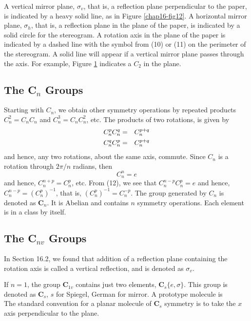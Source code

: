 A vertical mirror plane, $\sigma_v$, that is, a reflection plane
perpendicular to the paper, is indicated by a heavy solid line, as in
Figure \ref{chap16-fig12}.  A horizontal mirror plane, $\sigma_h$,
that is, a reflection plane in the plane of the paper, is indicated by
a solid circle for the stereogram.  A rotation axis in the plane of
the paper is indicated by a dashed line with the symbol from (10) or
(11) on the perimeter of the stereogram.  A solid line will appear if
a vertical mirror plane passes through the axis.  For example, Figure
\ref{chap16-fig13} indicates a $C_2$ in the plane.

\begin{figure}
\caption{}
\label{chap16-fig13}
\end{figure}

\subsection{The C$_n$ Groups}

Starting with $C_n$, we obtain other symmetry operations by repeated 
products $C^2_n = C_nC_n$ and $C^3_n = C_nC_n^2$, etc.  The products 
of two rotations, is given by
\begin{eqnarray}
C^p_n C^q_n &=& C^{p+q}_n\cr
C^q_n C^p_n &=& C_n^{p+q}
\label{chap16-eqno12a}
\end{eqnarray}
and hence, any two rotations, about the same axis, commute.  Since 
$C_n$ is a rotation through $2 \pi /n$ radians, then
\begin{equation}
C^n_n = e
\label{chap16-eqno12b}
\end{equation}
and hence, $C^{n+p}_n = C^p_n$, etc.  From (12), we see that 
$C^{n-p}_nC^p_n = e$ and hence, $C^{n-p}_n = (C^p_n)^{-1}$, that 
is, $(C^p_n)^{-1}=C^{-p}_n$.  The group generated by $C_n$ is denoted 
as {\bf C}$_n$.  It is Abelian and contains $n$ symmetry operations.  Each 
element is in a class by itself.

\subsection{The C$_{nv}$ Groups}

In Section 16.2, we found that addition of a reflection plane 
containing the rotation axis is called a vertical reflection, and is 
denoted as $\sigma_v$.

If $n = 1$, the group {\bf C}$_{1v}$ contains just two elements, {\bf 
C}$_s\{e,\sigma\}$.  This group is denoted as {\bf C}$_s$, $s$ for 
Spiegel, German for mirror.  A prototype molecule is
\begin{equation}
\end{equation}
The standard convention for a planar molecule of {\bf C}$_s$ symmetry 
is to take the $x$ axis perpendicular to the plane.

